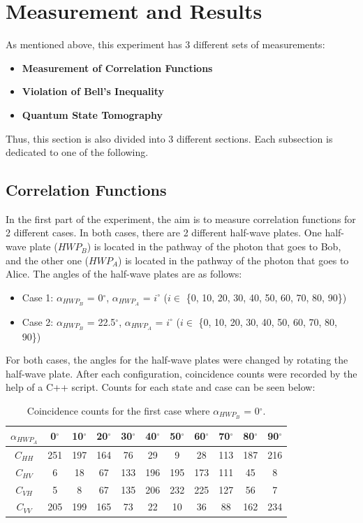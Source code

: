 \section{Measurement and Results}
As mentioned above, this experiment has 3 different sets of measurements: 
\begin{itemize}
    \item \textbf{Measurement of Correlation Functions}
    \item \textbf{Violation of Bell’s Inequality}
    \item \textbf{Quantum State Tomography}
\end{itemize}

Thus, this section is also divided into 3 different sections. Each subsection is dedicated to one of the following.

\subsection{Correlation Functions}
In the first part of the experiment, the aim is to measure correlation functions for 2 different cases. In both cases, there are 2 different half-wave plates. One half-wave plate ($HWP_{B}$) is located in the pathway of the photon that goes to Bob, and the other one ($HWP_{A}$) is located in the pathway of the photon that goes to Alice. The angles of the half-wave plates are as follows: 
\begin{itemize}
    \item {Case 1}:
        $\alpha_{HWP_{B}}$ = 0$^\circ$, $\alpha_{HWP_{A}}$ = $i^\circ$ ($i \in$ \{0, 10, 20, 30, 40, 50, 60, 70, 80, 90\})
    \item {Case 2}:
        $\alpha_{HWP_{B}}$ = 22.5$^\circ$, $\alpha_{HWP_{A}}$ = $i^\circ$ ($i \in$ \{0, 10, 20, 30, 40, 50, 60, 70, 80, 90\})
\end{itemize}
For both cases, the angles for the half-wave plates were changed by rotating the half-wave plate. After each configuration, coincidence counts were recorded by the help of a C++ script. Counts for each state and case can be seen below:

\begin{table}[h!]
    \centering
    \begin{tabular}{|c|c|c|c|c|c|c|c|c|c|c|}
        \hline
        $\alpha_{HWP_{A}}$ & 0$^\circ$ & 10$^\circ$ & 20$^\circ$ & 30$^\circ$ & 40$^\circ$ & 50$^\circ$ & 60$^\circ$ & 70$^\circ$ & 80$^\circ$ & 90$^\circ$ \\
        \hline
        $C_{HH}$ & 251 & 197 & 164 & 76 & 29 & 9 & 28 & 113 & 187 & 216 \\
        $C_{HV}$ & 6 & 18 & 67 & 133 & 196 & 195 & 173 & 111 & 45 & 8 \\
        $C_{VH}$ & 5 & 8 & 67 & 135 & 206 & 232 & 225 & 127 & 56 & 7 \\
        $C_{VV}$ & 205 & 199 & 165 & 73 & 22 & 10 & 36 & 88 & 162 & 234 \\
        \hline
    \end{tabular}
    \caption{Coincidence counts for the first case where $\alpha_{HWP_{B}}$ = 0$^\circ$.}
    \label{tab:coincidence_counts_case1}
\end{table}

